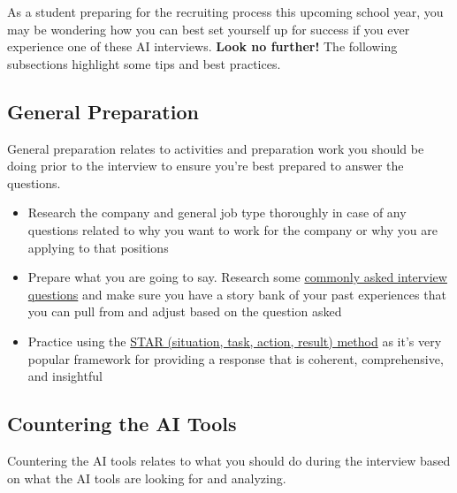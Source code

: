 \documentclass[
]{book}
\begin{document}
As a student preparing for the recruiting process this upcoming school year, you may be wondering how you can best set yourself up for success if you ever experience one of these AI interviews. \textbf{Look no further!} The following subsections highlight some tips and best practices.

\hypertarget{general-preparation}{%
\subsection{General Preparation}\label{general-preparation}}

General preparation relates to activities and preparation work you should be doing prior to the interview to ensure you're best prepared to answer the questions.

\begin{itemize}
\item
  Research the company and general job type thoroughly in case of any questions related to why you want to work for the company or why you are applying to that positions
\item
  Prepare what you are going to say. Research some \href{https://www.themuse.com/advice/interview-questions-and-answers}{commonly asked interview questions} and make sure you have a story bank of your past experiences that you can pull from and adjust based on the question asked
\item
  Practice using the \href{https://www.themuse.com/advice/star-interview-method}{STAR (situation, task, action, result) method} as it's very popular framework for providing a response that is coherent, comprehensive, and insightful
\end{itemize}

\hypertarget{countering-the-ai-tools}{%
\subsection{Countering the AI Tools}\label{countering-the-ai-tools}}

Countering the AI tools relates to what you should do during the interview based on what the AI tools are looking for and analyzing.
\end{document}
